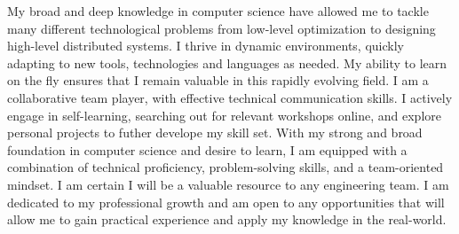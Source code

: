 
\begin{cvparagraph}

	My broad and deep knowledge in computer science have allowed me to tackle many
	different technological problems from low-level optimization to designing
	high-level distributed systems. I thrive in dynamic environments, quickly adapting to new
	tools, technologies and languages as needed. My ability to learn on the fly
	ensures that I remain valuable in this rapidly evolving field.
	I am a collaborative team player, with effective technical communication
	skills. I actively engage in self-learning, searching out for relevant
	workshops online, and explore personal projects to futher develope my skill
	set. With my strong and broad foundation in computer science and desire to
	learn, I am equipped with a combination of technical proficiency,
	problem-solving skills, and a team-oriented mindset. I am certain I will be a
	valuable resource to any engineering team. I am dedicated to my professional
	growth and am open to any opportunities that will allow me to gain practical
	experience and apply my knowledge in the real-world.

\end{cvparagraph}
